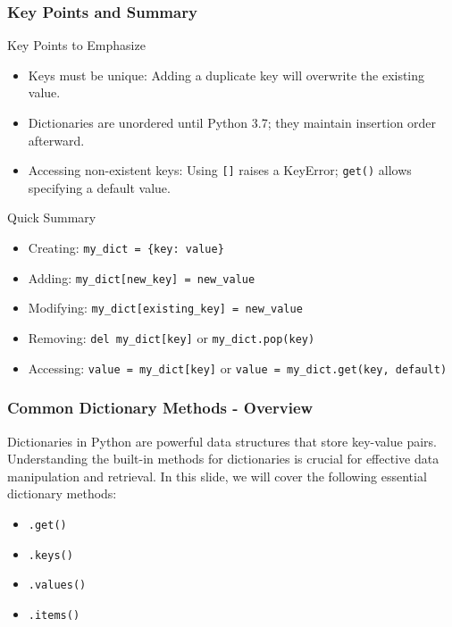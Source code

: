 \documentclass{beamer}
\begin{document}
\begin{frame}[fragile]
    \frametitle{Key Points and Summary}
    \begin{block}{Key Points to Emphasize}
        \begin{itemize}
            \item Keys must be unique: Adding a duplicate key will overwrite the existing value.
            \item Dictionaries are unordered until Python 3.7; they maintain insertion order afterward.
            \item Accessing non-existent keys: Using \texttt{[]} raises a KeyError; \texttt{get()} allows specifying a default value.
        \end{itemize}
    \end{block}
    
    \begin{block}{Quick Summary}
        \begin{itemize}
            \item Creating: \texttt{my\_dict = \{key: value\}}
            \item Adding: \texttt{my\_dict[new\_key] = new\_value}
            \item Modifying: \texttt{my\_dict[existing\_key] = new\_value}
            \item Removing: \texttt{del my\_dict[key]} or \texttt{my\_dict.pop(key)}
            \item Accessing: \texttt{value = my\_dict[key]} or \texttt{value = my\_dict.get(key, default)}
        \end{itemize}
    \end{block}
\end{frame}

\begin{frame}[fragile]
    \frametitle{Common Dictionary Methods - Overview}
    Dictionaries in Python are powerful data structures that store key-value pairs. 
    Understanding the built-in methods for dictionaries is crucial for effective data manipulation and retrieval. 
    In this slide, we will cover the following essential dictionary methods:
    \begin{itemize}
        \item \texttt{.get()}
        \item \texttt{.keys()}
        \item \texttt{.values()}
        \item \texttt{.items()}
    \end{itemize}
\end{frame}
\end{document}

